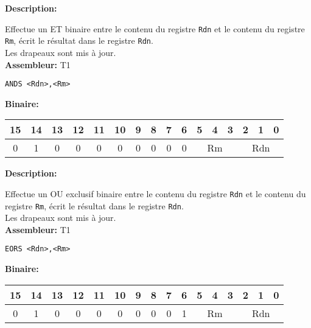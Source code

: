 
\textbf{Description: }

Effectue un ET binaire entre le contenu du registre \texttt{Rdn} et le contenu du registre \texttt{Rm}, écrit le résultat dans le registre \texttt{Rdn}.\\
Les drapeaux sont mis à jour.\\

\textbf{Assembleur:} T1

\begin{lstlisting}
ANDS <Rdn>,<Rm>
\end{lstlisting}

\textbf{Binaire:}\\

\begin{tabular}{| c c c c c c c c c c c c c c c c |}
\hline
15 & 14 & 13 & 12 & 11 & 10 & \multicolumn{1}{|c}{9} & 8 & 7 & 6 & \multicolumn{1}{|c}{5} & 4 & 3 & \multicolumn{1}{|c}{2} & 1 & 0 \\
\hline
0 & 1 & 0 & 0 & 0 & 0 & \multicolumn{1}{|c}{0} & 0 & 0 & 0 & \multicolumn{3}{|c}{Rm} & \multicolumn{3}{|c|}{Rdn} \\
\hline
\end{tabular}



\textbf{Description: }

Effectue un OU exclusif binaire entre le contenu du registre \texttt{Rdn} et le contenu du registre \texttt{Rm}, écrit le résultat dans le registre \texttt{Rdn}.\\
Les drapeaux sont mis à jour.\\

\textbf{Assembleur:} T1

\begin{lstlisting}
EORS <Rdn>,<Rm>
\end{lstlisting}

\textbf{Binaire:}\\

\begin{tabular}{| c c c c c c c c c c c c c c c c |}
\hline
15 & 14 & 13 & 12 & 11 & 10 & \multicolumn{1}{|c}{9} & 8 & 7 & 6 & \multicolumn{1}{|c}{5} & 4 & 3 & \multicolumn{1}{|c}{2} & 1 & 0 \\
\hline
0 & 1 & 0 & 0 & 0 & 0 & \multicolumn{1}{|c}{0} & 0 & 0 & 1 & \multicolumn{3}{|c}{Rm} & \multicolumn{3}{|c|}{Rdn} \\
\hline
\end{tabular}



